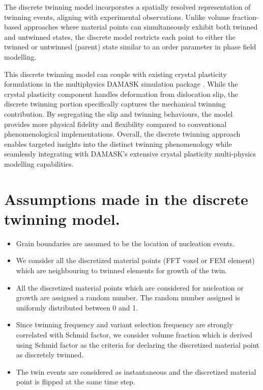 The discrete twinning model incorporates a spatially resolved representation of twinning events, aligning with experimental observations. Unlike volume fraction-based approaches where material points can simultaneously exhibit both twinned and untwinned states, the discrete model restricts each point to either the twinned or untwinned (parent) state similar to an order parameter in phase field modelling.

This discrete twinning model can couple with existing crystal plasticity formulations in the multiphysics DAMASK simulation package \cite{ROTERS2019420}. While the crystal plasticity component handles deformation from dislocation slip, the discrete twinning portion specifically captures the mechanical twinning contribution. By segregating the slip and twinning behaviours, the model provides more physical fidelity and flexibility compared to conventional phenomenological implementations. Overall, the discrete twinning approach enables targeted insights into the distinct twinning phenomenology while seamlessly integrating with DAMASK's extensive crystal plasticity multi-physics modelling capabilities.

\section{Assumptions made in the discrete twinning model.}

\begin{itemize}
\item Grain boundaries are assumed to be the location of nucleation events.
\item We consider all the discretized material points (FFT voxel or FEM element) which are neighbouring to twinned elements for growth of the twin.
\item All the discretized material points which are considered for nucleation or growth are assigned a random number. The random number assigned is uniformly distributed between 0 and 1.
\item Since twinning frequency and variant selection frequency are strongly correlated with Schmid factor, we consider volume fraction which is derived using Schmid factor as the criteria for declaring the discretized material point as discretely twinned. 
\item The twin events are considered as instantaneous and the discretized material point is flipped at the same time step.


\end{itemize}


